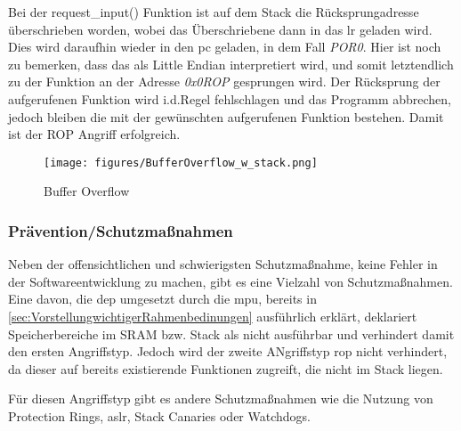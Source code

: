 \documentclass[a4paper,
DIV=13,
12pt,
BCOR=10mm,
department=FakIM,
oneside,
parskip=half,
automark,
listof=totocnumbered,
bibliography=totocnumbered,
acronym=totocnumbered
] {OTHRartcl}
\begin{document}
Bei der request\_input() Funktion ist auf dem Stack die Rücksprungadresse überschrieben worden, wobei das Überschriebene dann in das \ac{lr} geladen wird.
Dies wird daraufhin wieder in den \ac{pc} geladen, in dem Fall \textit{POR0}. Hier ist noch zu bemerken, dass das als Little Endian interpretiert wird, und somit
letztendlich zu der Funktion an der Adresse \textit{0x0ROP} gesprungen wird.
Der Rücksprung der aufgerufenen Funktion wird i.d.Regel fehlschlagen und das Programm abbrechen, jedoch bleiben die mit der gewünschten aufgerufenen Funktion bestehen.
Damit ist der ROP Angriff erfolgreich. \cite{IEEE Xplore ROP} \cite{OWASP Buffer Overflow Attack}
\begin{figure}[ht!]
  \begin{center}
    \texttt{[image: figures/BufferOverflow\_w\_stack.png]}
    \caption{Buffer Overflow}
    \label{fig: Buffer Overflow}
  \end{center}
\end{figure}

\subsubsection{Prävention/Schutzmaßnahmen}
Neben der offensichtlichen und schwierigsten Schutzmaßnahme, keine Fehler in der Softwareentwicklung zu machen, gibt es eine Vielzahl von Schutzmaßnahmen.
Eine davon, die \ac{dep} umgesetzt durch die \ac{mpu}, bereits in \autoref{sec:VorstellungwichtigerRahmenbedinungen} ausführlich erklärt, deklariert Speicherbereiche im SRAM bzw. Stack als nicht ausführbar
und verhindert damit den ersten Angriffstyp. Jedoch wird der zweite ANgriffstyp \ac{rop} nicht verhindert, da dieser auf bereits existierende Funktionen zugreift, die nicht im Stack liegen.

Für diesen Angriffstyp gibt es andere Schutzmaßnahmen wie die Nutzung von Protection Rings, \ac{aslr}, Stack Canaries oder Watchdogs.
\end{document}

